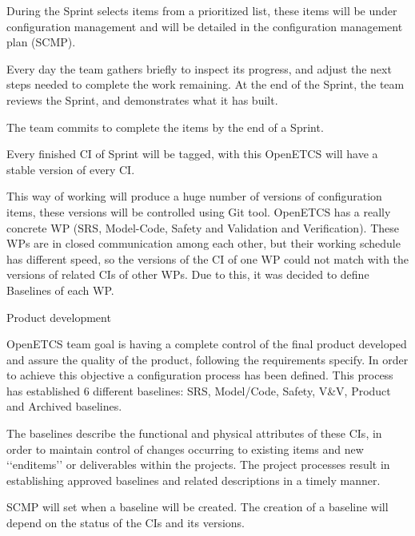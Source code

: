 \documentclass{template/openetcs_article}
\begin{document}
During the Sprint selects items from a prioritized list, these items will be under configuration management and will be detailed in the configuration management plan (SCMP). 

Every day the team gathers briefly to inspect its progress, and adjust the next steps needed to complete the work remaining. At the end of the Sprint, the team reviews the Sprint, and demonstrates what it has built. 

The team commits to complete the items by the end of a Sprint.

Every finished CI of Sprint will be tagged, with this OpenETCS will have a stable version of every CI.

This way of working will produce a huge number of versions of configuration items, these versions will be controlled using Git tool. OpenETCS has a really concrete WP (SRS, Model-Code, Safety and Validation and Verification). These WPs are in closed communication among each other, but their working schedule has different speed, so the versions of the CI of one WP could not match with the versions of related CIs of other WPs. Due to this, it was decided to define Baselines of each WP.

Product development

OpenETCS team goal is having a complete control of the final product developed and assure the quality of the product, following the requirements specify. In order to achieve this objective a configuration process has been defined. This process has established 6 different baselines: SRS, Model/Code, Safety, V\&V, Product and Archived baselines. 

The baselines describe the functional and physical attributes of these CIs, in order to maintain control of changes occurring to existing items and new {\textquoteleft}{\textquoteleft}enditems{\textquoteright}{\textquoteright} or deliverables within the projects. The project processes result in establishing approved baselines and related descriptions in a timely manner. 

SCMP will set when a baseline will be created. The creation of a baseline will depend on the status of the CIs and its versions.
\end{document}
